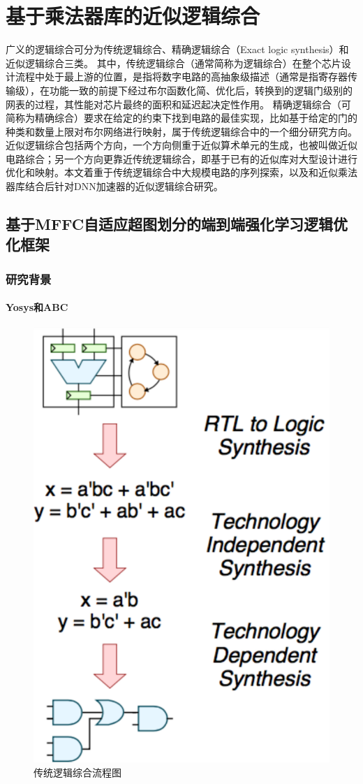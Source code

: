 \chapter{基于乘法器库的近似逻辑综合}


广义的逻辑综合可分为传统逻辑综合、精确逻辑综合（Exact logic synthesis）和近似逻辑综合三类。
其中，传统逻辑综合（通常简称为逻辑综合）在整个芯片设计流程中处于最上游的位置，是指将数字电路的高抽象级描述（通常是指寄存器传输级），在功能一致的前提下经过布尔函数化简、优化后，转换到的逻辑门级别的网表的过程，其性能对芯片最终的面积和延迟起决定性作用。
精确逻辑综合（可简称为精确综合）要求在给定的约束下找到电路的最佳实现，比如基于给定的门的种类和数量上限对布尔网络进行映射\cite{LS:exact_syn}，属于传统逻辑综合中的一个细分研究方向。
近似逻辑综合包括两个方向，一个方向侧重于近似算术单元的生成，也被叫做近似电路综合；另一个方向更靠近传统逻辑综合，即基于已有的近似库对大型设计进行优化和映射。本文着重于传统逻辑综合中大规模电路的序列探索，以及和近似乘法器库结合后针对DNN加速器的近似逻辑综合研究。

\section{基于MFFC自适应超图划分的端到端强化学习逻辑优化框架}

\subsection{研究背景}

\subsubsection{Yosys和ABC}

\begin{figure}[!htbp]
    \centering
    \includegraphics[width=0.4\linewidth]{./figs/LS-flow.png}
    \caption{传统逻辑综合流程图}
    \label{LS:flow}
\end{figure}

